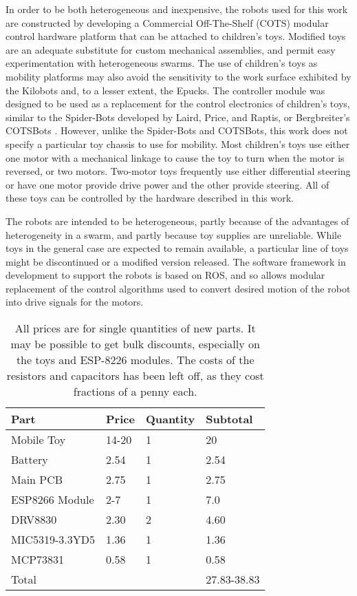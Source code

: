 \documentclass[]{article}
\begin{document}
In order to be both heterogeneous and inexpensive, the robots used for this work are constructed by developing a Commercial Off-The-Shelf (COTS) modular control hardware platform that can be attached to children's toys. 
Modified toys are an adequate substitute for custom mechanical assemblies, and permit easy experimentation with heterogeneous swarms. 
The use of children's toys as mobility platforms may also avoid the sensitivity to the work surface exhibited by the Kilobots and, to a lesser extent, the Epucks.
The controller module was designed to be used as a replacement for the control electronics of children's toys, similar to the Spider-Bots developed by Laird, Price, and Raptis, or Bergbreiter's COTSBots \cite{lairdspider, bergbreiter2003cotsbots}.
However, unlike the Spider-Bots and COTSBots, this work does not specify a particular toy chassis to use for mobility. 
Most children's toys use either one motor with a mechanical linkage to cause the toy to turn when the motor is reversed, or two motors.
Two-motor toys frequently use either differential steering or have one motor provide drive power and the other provide steering. 
All of these toys can be controlled by the hardware described in this work. 

The robots are intended to be heterogeneous, partly because of the advantages of heterogeneity in a swarm, and partly because toy supplies are unreliable.
While toys in the general case are expected to remain available, a particular line of toys might be discontinued or a modified version released. 
The software framework in development to support the robots is based on ROS, and so allows modular replacement of the control algorithms used to convert desired motion of the robot into drive signals for the motors. 

\begin{table}
	\begin{tabular}{l l l l}
	Part & Price & Quantity & Subtotal\\
	\hline
	Mobile Toy & 14-20 & 1 & 20 \\
	Battery & 2.54 & 1 & 2.54 \\
	Main PCB & 2.75 &  1 & 2.75 \\
	ESP8266 Module & 2-7 & 1 & 7.0 \\
	DRV8830 & 2.30 & 2 & 4.60 \\
	MIC5319-3.3YD5 & 1.36 & 1 & 1.36 \\
	MCP73831 & 0.58 & 1 & 0.58 \\
	\hline
	Total & & & 27.83-38.83\\
	\end{tabular}
	\caption{All prices are for single quantities of new parts. It may be possible to get bulk discounts, especially on the toys and ESP-8226 modules. The costs of the resistors and capacitors has been left off, as they cost fractions of a penny each.}
\end{table}
\end{document}
